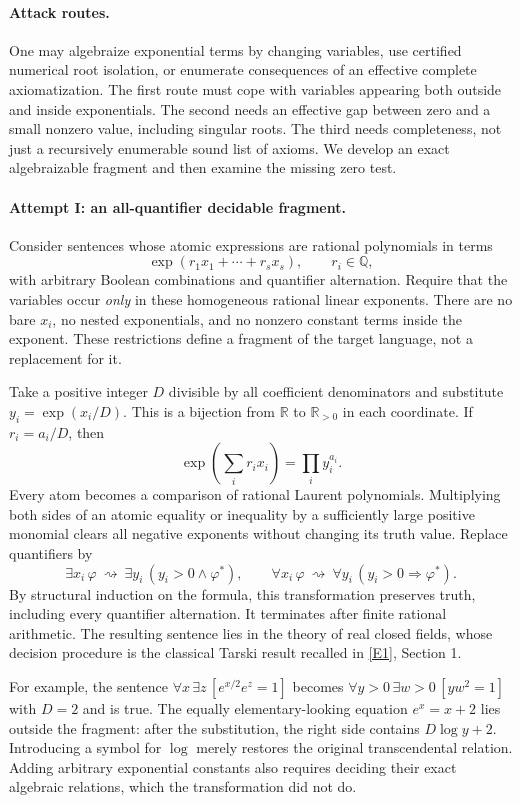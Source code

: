 \documentclass[11pt,a4paper]{article}
\newcommand{\Q}{\mathbb{Q}}
\newcommand{\R}{\mathbb{R}}
\newcommand{\eref}[2]{\hyperlink{extra:#1:#2}{[E#2]}}
\numberwithin{equation}{section}
\begin{document}
\paragraph{Attack routes.}
One may algebraize exponential terms by changing variables, use certified
numerical root isolation, or enumerate consequences of an effective
complete axiomatization.  The first route must cope with variables
appearing both outside and inside exponentials.  The second needs an
effective gap between zero and a small nonzero value, including singular
roots.  The third needs completeness, not just a recursively enumerable
sound list of axioms.  We develop an exact algebraizable fragment and
then examine the missing zero test.

\paragraph{Attempt I: an all-quantifier decidable fragment.}
Consider sentences whose atomic expressions are rational polynomials in
terms
\[
 \exp(r_1x_1+\cdots+r_sx_s),\qquad r_i\in\Q,
\]
with arbitrary Boolean combinations and quantifier alternation.  Require
that the variables occur \emph{only} in these homogeneous rational
linear exponents.  There are no bare $x_i$, no nested exponentials, and
no nonzero constant terms inside the exponent.  These restrictions
define a fragment of the target language, not a replacement for it.

Take a positive integer $D$ divisible by all coefficient denominators
and substitute $y_i=\exp(x_i/D)$.  This is a bijection from $\R$ to
$\R_{>0}$ in each coordinate.  If $r_i=a_i/D$, then
\[
 \exp\!\left(\sum_i r_i x_i\right)=\prod_i y_i^{a_i}.
\]
Every atom becomes a comparison of rational Laurent polynomials.
Multiplying both sides of an atomic equality or inequality by a
sufficiently large positive monomial clears all negative exponents
without changing its truth value.  Replace quantifiers by
\[
 \exists x_i\,\varphi\ \rightsquigarrow\
 \exists y_i\,(y_i>0\wedge\varphi^*),\qquad
 \forall x_i\,\varphi\ \rightsquigarrow\
 \forall y_i\,(y_i>0\Rightarrow\varphi^*).
\]
By structural induction on the formula, this transformation preserves
truth, including every quantifier alternation.  It terminates after
finite rational arithmetic.  The resulting sentence lies in the theory
of real closed fields, whose decision procedure is the classical
Tarski result recalled in \eref{124}{1}, Section 1.

For example, the sentence
$\forall x\,\exists z\,[e^{x/2}e^z=1]$ becomes
$\forall y>0\,\exists w>0\,[yw^2=1]$ with $D=2$ and is true.
The equally elementary-looking equation $e^x=x+2$ lies outside the
fragment: after the substitution, the right side contains $D\log y+2$.
Introducing a symbol for $\log$ merely restores the original
transcendental relation.  Adding arbitrary exponential constants also
requires deciding their exact algebraic relations, which the
transformation did not do.
\end{document}
